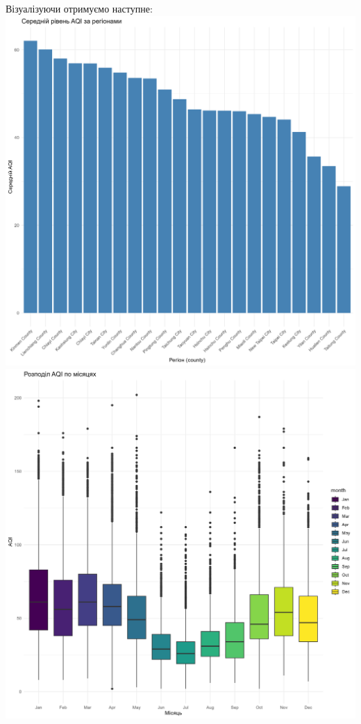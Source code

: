 \documentclass[./report.tex]{subfiles}
\begin{document}
\begin{enumerate}
    Візуалізуючи отримуємо наступне:
    \includegraphics[width=6in]{plots/question4/avg_aqi_by_country.png}
    \includegraphics[width=6in]{plots/question4/seasonal_change.png}
    

\end{enumerate}
\end{document}
